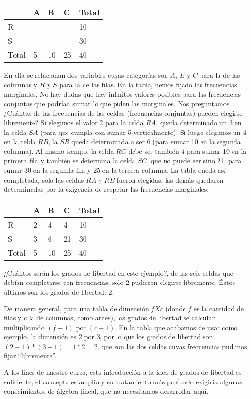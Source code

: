\documentclass[]{article}
\begin{document}
\begin{longtable}[]{@{}lllll@{}}
\toprule
& A & B & C & Total\tabularnewline
\midrule
\endhead
R & & & & 10\tabularnewline
S & & & & 30\tabularnewline
Total & 5 & 10 & 25 & 40\tabularnewline
\bottomrule
\end{longtable}

En ella se relacionan dos variables cuyas categorías son \(A\), \(B\) y
\(C\) para la de las columnas y \(R\) y \(S\) para la de las filas. En
la tabla, hemos fijado las frecuencias marginales. No hay dudas que hay
infinitos valores posibles para las frecuencias conjuntas que podrían
sumar lo que piden las marginales. Nos preguntamos ¿Cuántas de las
frecuencias de las celdas (frecuencias conjuntas) pueden elegirse
libremente? Si elegimos el valor 2 para la celda \(RA\), queda
determinado un 3 en la celda \(SA\) (para que cumpla con sumar 5
verticalmente). Si luego elegimos un 4 en la celda \(RB\), la \(SB\)
queda determinada a ser 6 (para sumar 10 en la segunda columna). Al
mismo tiempo, la celda \(RC\) debe ser también 4 para sumar 10 en la
primera fila y también se determina la celda \(SC\), que no puede ser
sino 21, para sumar 30 en la segunda fila y 25 en la tercera columna. La
tabla queda así completada, solo las celdas \(RA\) y \(RB\) fueron
elegidas, las demás quedaron determinadas por la exigencia de respetar
las frecuencias marginales.

\begin{longtable}[]{@{}lllll@{}}
\toprule
& A & B & C & Total\tabularnewline
\midrule
\endhead
R & 2 & 4 & 4 & 10\tabularnewline
S & 3 & 6 & 21 & 30\tabularnewline
Total & 5 & 10 & 25 & 40\tabularnewline
\bottomrule
\end{longtable}

¿Cuántos serán los grados de libertad en este ejemplo?, de las seis
celdas que debían completarse con frecuencias, solo 2 pudieron elegirse
libremente. Éstos últimos son los grados de libertad: 2.

De manera general, para una tabla de dimensión \(f X c\) (donde \(f\) es
la cantidad de filas y \(c\) la de columnas, como antes), los grados de
libertad se calculan multiplicando \((f-1)\) por \((c-1)\). En la tabla
que acabamos de usar como ejemplo, la dimensión es 2 por 3, por lo que
los grados de libertad son \((2-1)*(3-1)= 1*2=2\), que son las dos
celdas cuyas frecuencias pudimos fijar ``libremente''.

A los fines de nuestro curso, esta introducción a la idea de grados de
libertad es suficiente, el concepto es amplio y su tratamiento más
profundo exigiría algunos conocimientos de álgebra lineal, que no
necesitamos desarrollar aquí.
\end{document}
